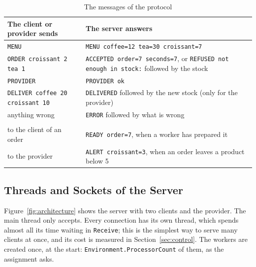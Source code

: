 \documentclass[12pt,a4paper]{article}
\begin{document}
\begin{table}[H]
  \centering
  \caption{The messages of the protocol}
  \renewcommand{\arraystretch}{1.2}
  \small
  \begin{tabular}{>{\raggedright\arraybackslash}p{}>{\raggedright\arraybackslash}p{}}
    \toprule
    \textbf{The client or provider sends} & \textbf{The server answers} \\
    \midrule
    \texttt{MENU} & \texttt{MENU coffee=12 tea=30 croissant=7} \\
    \texttt{ORDER croissant 2 tea 1} & \texttt{ACCEPTED order=7 seconds=7}, or \texttt{REFUSED not enough in stock:} followed by the stock \\
    \texttt{PROVIDER} & \texttt{PROVIDER ok} \\
    \texttt{DELIVER coffee 20 croissant 10} & \texttt{DELIVERED} followed by the new stock (only for the provider) \\
    anything wrong & \texttt{ERROR} followed by what is wrong \\
    \midrule
    \multicolumn{2}{l}{\textbf{The server sends by itself}} \\
    \midrule
    to the client of an order & \texttt{READY order=7}, when a worker has prepared it \\
    to the provider & \texttt{ALERT croissant=3}, when an order leaves a product below 5 \\
    \bottomrule
  \end{tabular}
  \label{tab:protocol}
\end{table}

\subsection{Threads and Sockets of the Server}

Figure~\ref{fig:architecture} shows the server with two clients and the provider. The main thread only accepts. Every connection has its own thread, which spends almost all its time waiting in \texttt{Receive}; this is the simplest way to serve many clients at once, and its cost is measured in Section~\ref{sec:control}. The workers are created once, at the start: \texttt{Environment.ProcessorCount} of them, as the assignment asks.
\end{document}
